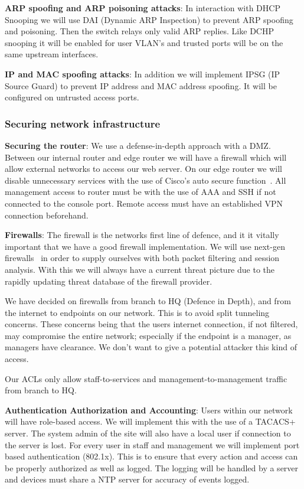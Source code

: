 \textbf{ARP spoofing and ARP poisoning attacks}: In interaction with DHCP Snooping we will use DAI (Dynamic ARP Inspection) to prevent ARP spoofing and poisoning. Then the switch relays only valid ARP replies. Like DCHP snooping it will be enabled for user VLAN's and trusted ports will be on the same upstream interfaces. 

\textbf{IP and MAC spoofing attacks}: In addition we will implement IPSG (IP Source Guard) to prevent IP address and MAC address spoofing. It will be configured on untrusted access ports.

\subsubsection{Securing network infrastructure}

\textbf{Securing the router}: We use a defense-in-depth approach with a DMZ. Between our internal router and edge router we will have a firewall which will allow external networks to access our web server. On our edge router we will disable unnecessary services with the use of Cisco's auto secure function~\cite{autosecure}. All management access to router must be with the use of AAA and SSH if not connected to the console port. Remote access must have an established VPN connection beforehand.

\textbf{Firewalls}: The firewall is the networks first line of defence, and it it vitally important that we have a good firewall implementation. We will use next-gen firewalls~\cite{nextgenfirewall} in order to supply ourselves with both packet filtering and session analysis. With this we will always have a current threat picture due to the rapidly updating threat database of the firewall provider.

We have decided on firewalls from branch to HQ (Defence in Depth), and from the internet to endpoints on our network. This is to avoid split tunneling concerns. These concerns being that the users internet connection, if not filtered, may compromise the entire network; especially if the endpoint is a manager, as managers have clearance. We don't want to give a potential attacker this kind of access.

Our ACLs only allow staff-to-services and management-to-management traffic from branch to HQ.

\textbf{Authentication Authorization and Accounting}: Users within our network will have role-based access. We will implement this with the use of a TACACS+ server. The system admin of the site will also have a local user if connection to the server is lost. For every user in staff and management we will implement port based authentication (802.1x). This is to ensure that every action and access can be properly authorized as well as logged. The logging will be handled by a server and devices must share a NTP server for accuracy of events logged.


